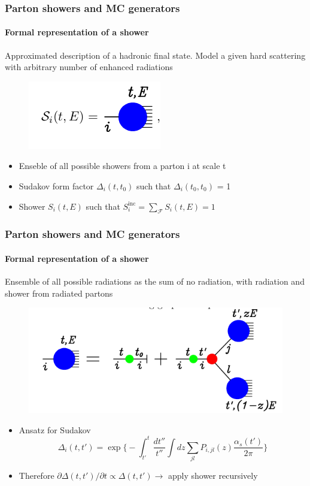 \documentclass[aspectratio=43]{beamer}
\begin{document}
\begin{frame}

	\frametitle{Parton showers and MC generators}
	\framesubtitle{Formal representation of a shower}
	
	Approximated description of a hadronic final state. Model a given hard scattering with arbitrary number of enhanced radiations
	
	\begin{figure}
		\includegraphics[width = 4 cm]{plots/shower_1.png}
	\end{figure}
		
	\begin{itemize} 
		\item Enseble of all possible showers from a parton {\color{blue}i} at scale {\color{blue}t}
		\item Sudakov form factor $\Delta_{i}(t, t_{0})$  such that $\Delta_{i}(t_{0}, t_{0})$ = 1
		\item Shower $S_{i}(t, E)$ 	such that $S_{i}^{\textrm{inc}} = \sum_{\mathcal{F}} S_{i}(t, E) = 1 $
	\end{itemize}

\end{frame}

\begin{frame}

	\frametitle{Parton showers and MC generators}
	\framesubtitle{Formal representation of a shower}
	 
	 
	 Ensemble of all possible radiations as the sum of no radiation, with radiation and shower from radiated partons
	\begin{figure}
		\includegraphics[width = 7 cm]{plots/shower_2.png}
	\end{figure}
	
	\begin{itemize} 
		\item Ansatz for Sudakov $$\Delta_{i}(t, t') = \exp\Bigg\{- \int_{t'}^{t} \frac{dt''}{t''}\int dz \sum_{jl} P_{i, jl}(z) \frac{\alpha_{s}(t')}{2\pi} \Bigg\}$$
		\item Therefore $\partial \Delta(t, t') / \partial t \propto \Delta(t, t') \longrightarrow$ apply shower recursively
	\end{itemize}

\end{frame}
\end{document}
